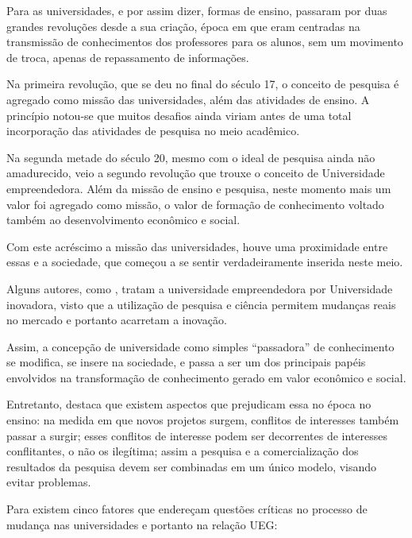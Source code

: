 Para  as universidades, e por assim dizer, formas de ensino, passaram por duas grandes revoluções desde a sua criação, época em que eram centradas na transmissão de conhecimentos dos professores para os alunos, sem um movimento de troca, apenas de repassamento de informações.

Na primeira revolução, que se deu no final do século 17, o conceito de pesquisa é agregado como missão das universidades, além das atividades de ensino. A princípio notou-se que muitos desafios ainda viriam antes de uma total incorporação das atividades de pesquisa no meio acadêmico.

Na segunda metade do século 20, mesmo com o ideal de pesquisa ainda não amadurecido, veio a segundo revolução que trouxe o conceito de Universidade empreendedora. Além da missão de ensino e pesquisa, neste momento mais um valor foi agregado como missão, o valor de formação de conhecimento voltado também ao desenvolvimento econômico e social.

Com este acréscimo a missão das universidades, houve uma proximidade entre essas e a sociedade, que começou a se sentir verdadeiramente inserida neste meio.

Alguns autores, como , tratam a universidade empreendedora por Universidade inovadora, visto que a utilização de pesquisa e ciência permitem mudanças reais no mercado e portanto acarretam a inovação.

Assim, a concepção de universidade como simples “passadora” de conhecimento se modifica, se insere na sociedade, e passa a ser um dos principais papéis envolvidos na transformação de conhecimento gerado em valor econômico e social.

Entretanto,  destaca que existem aspectos que prejudicam essa no época no ensino: na medida em que novos projetos surgem, conflitos de interesses também passar a surgir; esses conflitos de interesse podem ser decorrentes de interesses conflitantes, o não os ilegítima; assim a pesquisa e a comercialização dos resultados da pesquisa devem ser combinadas em um único modelo, visando evitar problemas.

Para  existem cinco fatores que endereçam questões críticas no processo de mudança nas universidades e portanto na relação UEG:

